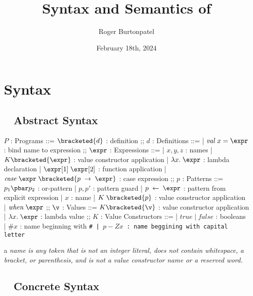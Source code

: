 \documentclass[]{article}
\title{Syntax and Semantics of \PPlus}
\author{Roger Burtonpatel}
\date{February 18th, 2024}
\begin{document}
\maketitle

\section{Syntax}

\subsection{\PPlus~ Abstract Syntax}

\bigskip

\begin{center}
    \begin{bnf}
    $P$ : \textsf{Programs} ::=
    $\bracketed{d}$ : definition
    ;;
    $d$ : \textsf{Definitions} ::=
    | $\mathit{val} \; x \; \tt{=} \; \expr$ : bind name to expression
    ;;
    $\expr$ : Expressions ::= 
    | $x, y, z$ : names
    | $K\bracketed{\expr}$ : value constructor application 
    | $\lambda x. \; \expr$ : lambda declaration  
    | $\expr[1] \; \expr[2]$ : function application 
    | $\mathit{case} \; \expr \; \bracketed{p \; \rightarrow \; \expr}$ : case expression 
    ;;
    $p$ : \textsf{Patterns} ::= $p_{1}\pbar p_{2}$ : or-pattern
    | $p, p'$ : pattern guard 
    | $p \; \leftarrow \; \expr$ : pattern from explicit expression  
    | $x$ : name 
    | $K \; \bracketed{p}$ : value constructor application 
    | $\mathit{when}\; \expr$
    ;;
    $\v$ : Values ::= $K\bracketed{\v}$ : value constructor application 
    | $\lambda x. \; \expr$ : lambda value 
    ;;
    $K$ : \textsf{Value Constructors} ::=
    | $\mathit{true} \;\vert\; \mathit{false}$ : booleans
    | $\mathit{\#}x$ : name beginning with \tt{\#}
    | $\mathit{p-Z}x$ : name beggining with capital letter
    \end{bnf}
\end{center}


a \it{name} is any token that is not an integer literal, 
does not contain whitespace, a bracket, or parenthesis, 
and is not a value constructor name or a reserved word.

\vfilbreak

\subsection{\PPlus~ Concrete Syntax}
\end{document}
